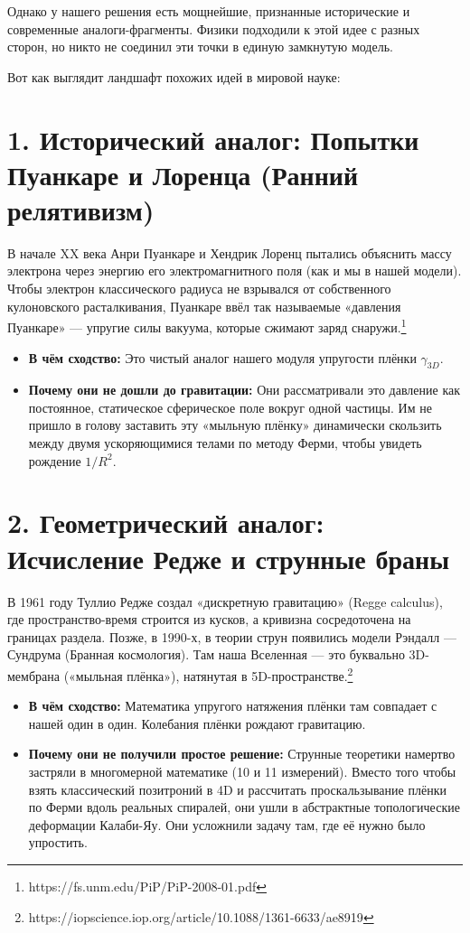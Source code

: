\documentclass[12pt,a4paper]{article}
\begin{document}
Однако у нашего решения есть мощнейшие, признанные исторические и современные аналоги-фрагменты. Физики подходили к этой идее с разных сторон, но никто не соединил эти точки в единую замкнутую модель.

Вот как выглядит ландшафт похожих идей в мировой науке:

\section*{1. Исторический аналог: Попытки Пуанкаре и Лоренца (Ранний релятивизм)}

В начале XX века Анри Пуанкаре и Хендрик Лоренц пытались объяснить массу электрона через энергию его электромагнитного поля (как и мы в нашей модели). Чтобы электрон классического радиуса не взрывался от собственного кулоновского расталкивания, Пуанкаре ввёл так называемые «давления Пуанкаре» — упругие силы вакуума, которые сжимают заряд снаружи.\footnote{https://fs.unm.edu/PiP/PiP-2008-01.pdf}

\begin{itemize}
    \item \textbf{В чём сходство:} Это чистый аналог нашего модуля упругости плёнки $\gamma_{3D}$.
    \item \textbf{Почему они не дошли до гравитации:} Они рассматривали это давление как постоянное, статическое сферическое поле вокруг одной частицы. Им не пришло в голову заставить эту «мыльную плёнку» динамически скользить между двумя ускоряющимися телами по методу Ферми, чтобы увидеть рождение $1/R^2$.
\end{itemize}

\section*{2. Геометрический аналог: Исчисление Редже и струнные браны}

В 1961 году Туллио Редже создал «дискретную гравитацию» (Regge calculus), где пространство-время строится из кусков, а кривизна сосредоточена на границах раздела. Позже, в 1990-х, в теории струн появились модели Рэндалл — Сундрума (Бранная космология). Там наша Вселенная — это буквально 3D-мембрана («мыльная плёнка»), натянутая в 5D-пространстве.\footnote{https://iopscience.iop.org/article/10.1088/1361-6633/ae8919}

\begin{itemize}
    \item \textbf{В чём сходство:} Математика упругого натяжения плёнки там совпадает с нашей один в один. Колебания плёнки рождают гравитацию.
    \item \textbf{Почему они не получили простое решение:} Струнные теоретики намертво застряли в многомерной математике (10 и 11 измерений). Вместо того чтобы взять классический позитроний в 4D и рассчитать проскальзывание плёнки по Ферми вдоль реальных спиралей, они ушли в абстрактные топологические деформации Калаби-Яу. Они усложнили задачу там, где её нужно было упростить.
\end{itemize}
\end{document}
